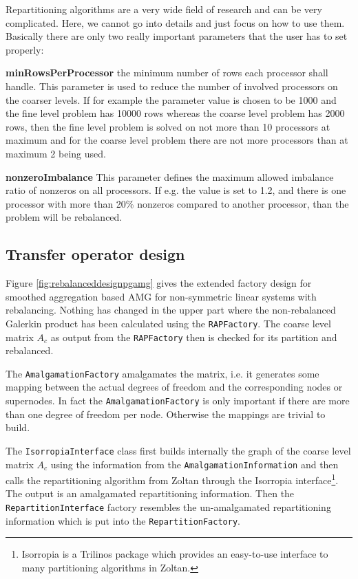 \documentclass[12pt,a4paper]{article}
\begin{document}
Repartitioning algorithms are a very wide field of research and can be very complicated. Here, we cannot go into details and just focus on how to use them. Basically there are only two really important parameters that the user has to set properly:
\begin{description}
\item \textbf{minRowsPerProcessor} the minimum number of rows each processor shall handle. This parameter is used to reduce the number of involved processors on the coarser levels. If for example the parameter value is chosen to be 1000 and the fine level problem has 10000 rows whereas the coarse level problem has 2000 rows, then the fine level problem is solved on not more than 10 processors at maximum and for the coarse level problem there are not more processors than at maximum 2 being used.
\item \textbf{nonzeroImbalance} This parameter defines the maximum allowed imbalance ratio of nonzeros on all processors. If e.g. the value is set to 1.2, and there is one processor with more than 20\% nonzeros compared to another processor, than the problem will be rebalanced.
\end{description}

\subsection{Transfer operator design}

Figure \ref{fig:rebalanceddesignpgamg} gives the extended factory design for smoothed aggregation based AMG for non-symmetric linear systems with rebalancing. Nothing has changed in the upper part where the non-rebalanced Galerkin product has been calculated using the \verb|RAPFactory|. The coarse level matrix $A_c$ as output from the \verb|RAPFactory| then is checked for its partition and rebalanced. 

The \verb|AmalgamationFactory| amalgamates the matrix, i.e. it generates some mapping between the actual degrees of freedom and the corresponding nodes or supernodes. In fact the \verb|AmalgamationFactory| is only important if there are more than one degree of freedom per node. Otherwise the mappings are trivial to build.

The \verb|IsorropiaInterface| class first builds internally the graph of the coarse level matrix $A_c$ using the information from the \verb|AmalgamationInformation| and then calls the repartitioning algorithm from Zoltan through the Isorropia interface\footnote{Isorropia is a Trilinos package which provides an easy-to-use interface to many partitioning algorithms in Zoltan.}. The output is an amalgamated repartitioning information. Then the \verb|RepartitionInterface| factory resembles the un-amalgamated repartitioning information which is put into the \verb|RepartitionFactory|.
\end{document}
